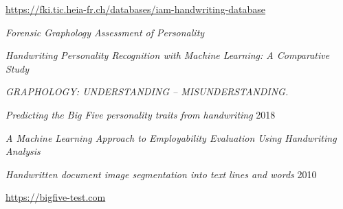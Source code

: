 \documentclass[10pt, a4paper]{article}
\begin{document}
\begin{thebibliography}{99}
         \url{https://fki.tic.heia-fr.ch/databases/iam-handwriting-database} 

         \emph{Forensic Graphology Assessment of Personality}

         \emph{Handwriting Personality Recognition with Machine  Learning: A Comparative Study}

         \emph{GRAPHOLOGY: UNDERSTANDING – MISUNDERSTANDING.}

         \emph{Predicting the Big Five personality traits from handwriting } 2018

         \emph{A Machine Learning Approach to Employability Evaluation Using Handwriting Analysis}

         \emph{Handwritten document image segmentation into text lines and words} 2010
        
         \url{https://bigfive-test.com}
    \end{thebibliography}
\end{document}
